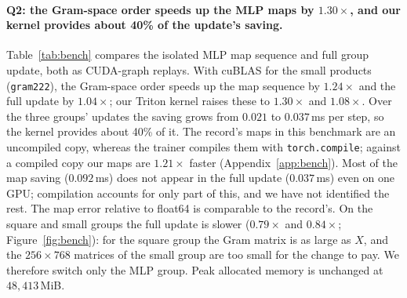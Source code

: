 \documentclass{article}
\begin{document}
\paragraph{Q2: the Gram-space order speeds up the MLP maps by $1.30\times$, and our kernel provides about 40\% of the update's saving.} Table~\ref{tab:bench} compares the isolated MLP map sequence and full group update, both as CUDA-graph replays. With cuBLAS for the small products (\texttt{gram222}), the Gram-space order speeds up the map sequence by $1.24\times$ and the full update by $1.04\times$; our Triton kernel raises these to $1.30\times$ and $1.08\times$. Over the three groups' updates the saving grows from $0.021$ to $0.037$\,ms per step, so the kernel provides about 40\% of it. The record's maps in this benchmark are an uncompiled copy, whereas the trainer compiles them with \texttt{torch.compile}; against a compiled copy our maps are $1.21\times$ faster (Appendix~\ref{app:bench}). Most of the map saving ($0.092$\,ms) does not appear in the full update ($0.037$\,ms) even on one GPU; compilation accounts for only part of this, and we have not identified the rest. The map error relative to float64 is comparable to the record's. On the square and small groups the full update is slower ($0.79\times$ and $0.84\times$; Figure~\ref{fig:bench}): for the square group the Gram matrix is as large as $X$, and the $256\times768$ matrices of the small group are too small for the change to pay. We therefore switch only the MLP group. Peak allocated memory is unchanged at $48{,}413$\,MiB.
\end{document}
